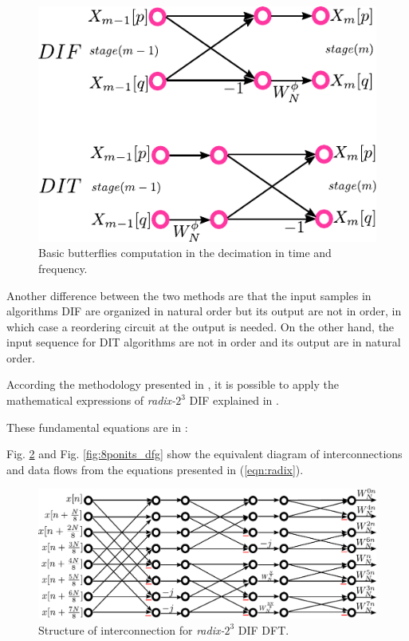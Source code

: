 \documentclass[journal,comsoc]{IEEEtran}
\begin{document}
\begin{figure} 
	\centering
	\includegraphics[width=0.65\linewidth]{Diagramas/miSeccionFiguras/DifDit.pdf}
	\caption{Basic butterflies computation in the decimation in time and frequency.}
	\label{fig:difdit}
\end{figure}

Another difference between the two methods are that the input samples in algorithms DIF are organized in natural order but its output are not in order, in which case a reordering circuit at the output is needed. On the other hand, the input sequence for DIT algorithms are not in order and its output are in natural order.

According the methodology presented in \cite{proakis_digital_nodate}, it is possible to apply the mathematical expressions of \textit{radix-}$2^3$ DIF explained in \cite{jia_efficient_nodate}. 

These fundamental equations are in :
\begingroup
\allowdisplaybreaks
\begin{small}

\end{small}
\endgroup


Fig. \ref{fig:8ponits_df} and Fig. \ref{fig:8ponits_dfg} show the equivalent diagram of interconnections and data flows from the equations presented in (\ref{eqn:radix}).


\begin{figure}[ht] 
	\centering
	\includegraphics[width=\linewidth]{Diagramas/miSeccionFiguras/8PuntosRadix8Conexion.pdf}
	\caption{Structure of interconnection for \textit{radix-}$2^3$ DIF DFT.}
	\label{fig:8ponits_df}
\end{figure}
\end{document}
